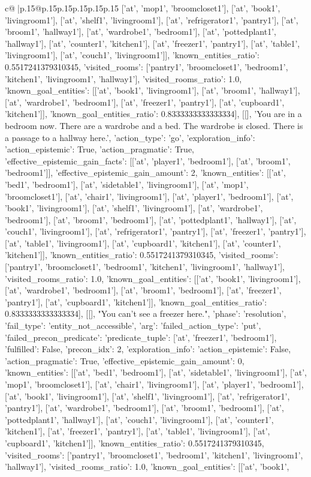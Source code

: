 \documentclass{article}
\begin{document}
{\begin{supertabular}{c@{$\;$}|p{.15\linewidth}@{}p{.15\linewidth}p{.15\linewidth}p{.15\linewidth}p{.15\linewidth}p{.15\linewidth}}
{{{['at', 'mop1', 'broomcloset1'], ['at', 'book1', 'livingroom1'], ['at', 'shelf1', 'livingroom1'], ['at', 'refrigerator1', 'pantry1'], ['at', 'broom1', 'hallway1'], ['at', 'wardrobe1', 'bedroom1'], ['at', 'pottedplant1', 'hallway1'], ['at', 'counter1', 'kitchen1'], ['at', 'freezer1', 'pantry1'], ['at', 'table1', 'livingroom1'], ['at', 'couch1', 'livingroom1']], 'known_entities_ratio': 0.5517241379310345, 'visited_rooms': ['pantry1', 'broomcloset1', 'bedroom1', 'kitchen1', 'livingroom1', 'hallway1'], 'visited_rooms_ratio': 1.0, 'known_goal_entities': [['at', 'book1', 'livingroom1'], ['at', 'broom1', 'hallway1'], ['at', 'wardrobe1', 'bedroom1'], ['at', 'freezer1', 'pantry1'], ['at', 'cupboard1', 'kitchen1']], 'known_goal_entities_ratio': 0.8333333333333334}}], [[], 'You are in a bedroom now. There are a wardrobe and a bed. The wardrobe is closed. There is a passage to a hallway here.', {'action_type': 'go', 'exploration_info': {'action_epistemic': True, 'action_pragmatic': True, 'effective_epistemic_gain_facts': [['at', 'player1', 'bedroom1'], ['at', 'broom1', 'bedroom1']], 'effective_epistemic_gain_amount': 2, 'known_entities': [['at', 'bed1', 'bedroom1'], ['at', 'sidetable1', 'livingroom1'], ['at', 'mop1', 'broomcloset1'], ['at', 'chair1', 'livingroom1'], ['at', 'player1', 'bedroom1'], ['at', 'book1', 'livingroom1'], ['at', 'shelf1', 'livingroom1'], ['at', 'wardrobe1', 'bedroom1'], ['at', 'broom1', 'bedroom1'], ['at', 'pottedplant1', 'hallway1'], ['at', 'couch1', 'livingroom1'], ['at', 'refrigerator1', 'pantry1'], ['at', 'freezer1', 'pantry1'], ['at', 'table1', 'livingroom1'], ['at', 'cupboard1', 'kitchen1'], ['at', 'counter1', 'kitchen1']], 'known_entities_ratio': 0.5517241379310345, 'visited_rooms': ['pantry1', 'broomcloset1', 'bedroom1', 'kitchen1', 'livingroom1', 'hallway1'], 'visited_rooms_ratio': 1.0, 'known_goal_entities': [['at', 'book1', 'livingroom1'], ['at', 'wardrobe1', 'bedroom1'], ['at', 'broom1', 'bedroom1'], ['at', 'freezer1', 'pantry1'], ['at', 'cupboard1', 'kitchen1']], 'known_goal_entities_ratio': 0.8333333333333334}}], [[], "You can't see a freezer here.", {'phase': 'resolution', 'fail_type': 'entity_not_accessible', 'arg': {'failed_action_type': 'put', 'failed_precon_predicate': {'predicate_tuple': ['at', 'freezer1', 'bedroom1'], 'fulfilled': False, 'precon_idx': 2}}, 'exploration_info': {'action_epistemic': False, 'action_pragmatic': True, 'effective_epistemic_gain_amount': 0, 'known_entities': [['at', 'bed1', 'bedroom1'], ['at', 'sidetable1', 'livingroom1'], ['at', 'mop1', 'broomcloset1'], ['at', 'chair1', 'livingroom1'], ['at', 'player1', 'bedroom1'], ['at', 'book1', 'livingroom1'], ['at', 'shelf1', 'livingroom1'], ['at', 'refrigerator1', 'pantry1'], ['at', 'wardrobe1', 'bedroom1'], ['at', 'broom1', 'bedroom1'], ['at', 'pottedplant1', 'hallway1'], ['at', 'couch1', 'livingroom1'], ['at', 'counter1', 'kitchen1'], ['at', 'freezer1', 'pantry1'], ['at', 'table1', 'livingroom1'], ['at', 'cupboard1', 'kitchen1']], 'known_entities_ratio': 0.5517241379310345, 'visited_rooms': ['pantry1', 'broomcloset1', 'bedroom1', 'kitchen1', 'livingroom1', 'hallway1'], 'visited_rooms_ratio': 1.0, 'known_goal_entities': [['at', 'book1', }}}
\end{supertabular}}
\end{document}
